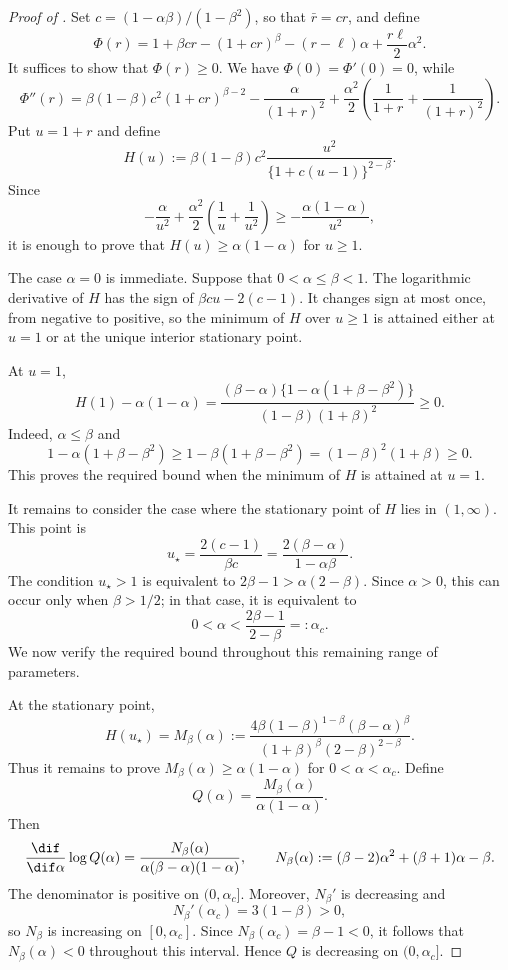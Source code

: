 \documentclass[11pt]{article}
\let\cref\zcref
\begin{document}
\begin{proof}[Proof of \cref{lem:chord-comparison}]
Set $c=(1-\alpha\beta)/(1-\beta^2)$, so that $\bar r=cr$, and define
\[
  \Phi(r)=1+\beta cr-(1+cr)^\beta-(r-\ell)\alpha+\frac{r\ell}{2}\alpha^2.
\]
It suffices to show that $\Phi(r)\geq0$. We have $\Phi(0)=\Phi'(0)=0$, while
\[
  \Phi''(r)=\beta(1-\beta)c^2(1+cr)^{\beta-2}-\frac{\alpha}{(1+r)^2}+\frac{\alpha^2}{2}\left(\frac1{1+r}+\frac1{(1+r)^2}\right).
\]
Put $u=1+r$ and define
\[
  H(u):=\beta(1-\beta)c^2\frac{u^2}{\{1+c(u-1)\}^{2-\beta}}.
\]
Since
\[
  -\frac{\alpha}{u^2}+\frac{\alpha^2}{2}\left(\frac1u+\frac1{u^2}\right)\geq-\frac{\alpha(1-\alpha)}{u^2},
\]
it is enough to prove that $H(u)\geq\alpha(1-\alpha)$ for $u\geq1$.

The case $\alpha=0$ is immediate. Suppose that $0<\alpha\leq\beta<1$. The logarithmic derivative of $H$ has the sign of $\beta cu-2(c-1)$. It changes sign at most once, from negative to positive, so the minimum of $H$ over $u\geq1$ is attained either at $u=1$ or at the unique interior stationary point.

At $u=1$,
\[
  H(1)-\alpha(1-\alpha)=\frac{(\beta-\alpha)\{1-\alpha(1+\beta-\beta^2)\}}{(1-\beta)(1+\beta)^2}\geq0.
\]
Indeed, $\alpha\leq\beta$ and
\[
  1-\alpha(1+\beta-\beta^2)\geq1-\beta(1+\beta-\beta^2)=(1-\beta)^2(1+\beta)\geq0.
\]
This proves the required bound when the minimum of $H$ is attained at $u=1$.

It remains to consider the case where the stationary point of $H$ lies in $(1,\infty)$. This point is
\[
  u_\star=\frac{2(c-1)}{\beta c}=\frac{2(\beta-\alpha)}{1-\alpha\beta}.
\]
The condition $u_\star>1$ is equivalent to $2\beta-1>\alpha(2-\beta)$. Since $\alpha>0$, this can occur only when $\beta>1/2$; in that case, it is equivalent to
\[
  0<\alpha<\frac{2\beta-1}{2-\beta}=:\alpha_c.
\]
We now verify the required bound throughout this remaining range of parameters.

At the stationary point,
\[
  H(u_\star)=M_\beta(\alpha):=\frac{4\beta(1-\beta)^{1-\beta}(\beta-\alpha)^\beta}{(1+\beta)^\beta(2-\beta)^{2-\beta}}.
\]
Thus it remains to prove $M_\beta(\alpha)\geq\alpha(1-\alpha)$ for $0<\alpha<\alpha_c$. Define
\[
  Q(\alpha)=\frac{M_\beta(\alpha)}{\alpha(1-\alpha)}.
\]
Then
\[
  \frac{\dif}{\dif\alpha}\log Q(\alpha)=\frac{N_\beta(\alpha)}{\alpha(\beta-\alpha)(1-\alpha)}, \qquad N_\beta(\alpha):=(\beta-2)\alpha^2+(\beta+1)\alpha-\beta.
\]
The denominator is positive on $(0,\alpha_c]$. Moreover, $N_\beta'$ is decreasing and
\[
  N_\beta'(\alpha_c)=3(1-\beta)>0,
\]
so $N_\beta$ is increasing on $[0,\alpha_c]$. Since $N_\beta(\alpha_c)=\beta-1<0$, it follows that $N_\beta(\alpha)<0$ throughout this interval. Hence $Q$ is decreasing on $(0,\alpha_c]$.


\end{proof}
\end{document}
